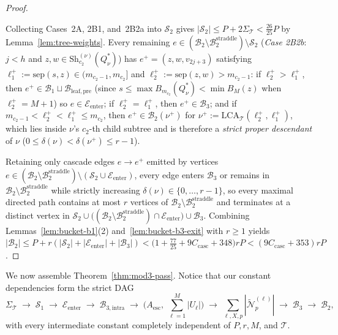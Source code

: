 \documentclass[11pt]{article}
\theoremstyle{definition}
\theoremstyle{remark}
\newcommand{\LCA}{\mathrm{LCA}}
\newcommand{\sep}{\mathrm{sep}}
\begin{document}
\begin{proof}
\begin{itemize}[leftmargin=2em]
\end{itemize}
Collecting Cases~2A, 2B1, and~2B2a into $\mathcal{S}_2$ gives $|\mathcal{S}_2| \le P + 2\Sigma_{\mathcal{T}} < \frac{26}{25} P$ by Lemma~\ref{lem:tree-weights}. Every remaining $e \in (\mathcal{B}_2 \setminus \mathcal{B}_2^{\mathrm{straddle}}) \setminus \mathcal{S}_2$ (\emph{Case 2B2b}: $j < h$ and $z, w \in \mathrm{Sh}_{c_2}^{(\nu)}(Q^*_\nu)$) has $e^+ = (z, w, v_{2j+3})$ satisfying $\ell_1^+ := \sep(s, z) \in (m_{c_2 - 1}, m_{c_2}]$ and $\ell_2^+ := \sep(z, w) > m_{c_2 - 1}$: if $\ell_2^+ > \ell_1^+$, then $e^+ \in \mathcal{B}_1 \sqcup \mathcal{B}_{\mathrm{leaf,pre}}$ (since $s \le \max B_{m_{c_2}}(Q^*_\nu) < \min B_M(z)$ when $\ell_2^+ = M + 1$) so $e \in \mathcal{E}_{\mathrm{enter}}$; if $\ell_2^+ = \ell_1^+$, then $e^+ \in \mathcal{B}_3$; and if $m_{c_2 - 1} < \ell_2^+ < \ell_1^+ \le m_{c_2}$, then $e^+ \in \mathcal{B}_2(\nu^+)$ for $\nu^+ := \LCA_{\mathcal{T}}(\ell_2^+, \ell_1^+)$, which lies inside $\nu$'s $c_2$-th child subtree and is therefore a \emph{strict proper descendant} of $\nu$ ($0 \le \delta(\nu) < \delta(\nu^+) \le r - 1$).

Retaining only cascade edges $e \to e^+$ emitted by vertices $e \in (\mathcal{B}_2 \setminus \mathcal{B}_2^{\mathrm{straddle}}) \setminus (\mathcal{S}_2 \cup \mathcal{E}_{\mathrm{enter}})$, every edge enters $\mathcal{B}_3$ or remains in $\mathcal{B}_2 \setminus \mathcal{B}_2^{\mathrm{straddle}}$ while strictly increasing $\delta(\nu) \in \{0, \dots, r - 1\}$, so every maximal directed path contains at most $r$ vertices of $\mathcal{B}_2 \setminus \mathcal{B}_2^{\mathrm{straddle}}$ and terminates at a distinct vertex in $\mathcal{S}_2 \cup \big((\mathcal{B}_2 \setminus \mathcal{B}_2^{\mathrm{straddle}}) \cap \mathcal{E}_{\mathrm{enter}}\big) \cup \mathcal{B}_3$. Combining Lemmas~\ref{lem:bucket-b1}(2) and~\ref{lem:bucket-b3-exit} with $r \ge 1$ yields $|\mathcal{B}_2| \le P + r(|\mathcal{S}_2| + |\mathcal{E}_{\mathrm{enter}}| + |\mathcal{B}_3|) < \big(1 + \frac{77}{25} + 9 C_{\mathrm{casc}} + 348\big) r P < (9 C_{\mathrm{casc}} + 353) r P$.
\end{proof}

We now assemble Theorem~\ref{thm:mod3-pass}. Notice that our constant dependencies form the strict DAG
\[
\Sigma_{\mathcal{T}} \;\longrightarrow\; \mathcal{S}_1 \;\longrightarrow\; \mathcal{E}_{\mathrm{enter}} \;\longrightarrow\; \mathcal{B}_{3,\mathrm{intra}} \;\longrightarrow\; \Big(A_{\mathrm{esc}},\; \sum_{\ell=1}^M |U_\ell|\Big) \;\longrightarrow\; \sum_{\ell, X, p} |\widetilde{\mathcal{N}}_p^{(\ell)}| \;\longrightarrow\; \mathcal{B}_3 \;\longrightarrow\; \mathcal{B}_2,
\]
with every intermediate constant completely independent of $P, r, M$, and $\mathcal{T}$.
\end{document}
